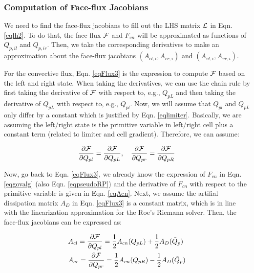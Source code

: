 \documentclass[12pt, letterpaper]{report}
\begin{document}
\subsubsection{Computation of Face-flux Jacobians}

We need to find the face-flux jacobians to fill out the LHS matrix $\mathcal{L}$ in Eqn. \ref{eqlh2}. To do
that, the face flux $\mathcal{F}$ and $F_{vn}$ will be approximated as functions of $Q_{p,il}$ and
$Q_{p,ir}$. Then, we take the corresponding derivatives to make an approximation about the face-flux
jacobians $(A_{cl,i}, A_{cr,i})$ and $(A_{vl,i}, A_{vr,i})$. \paraspace

For the convective flux, Eqn. \ref{eqFlux3} is the expression to compute $\mathcal{F}$ based on the left and
right state. When taking the derivatives, we can use the chain rule by first taking the derivative
of $\mathcal{F}$ with respect to, e.g., $Q_{pL}$ and then taking the derivative of $Q_{pL}$ with respect
to, e.g., $Q_{pl}$. Now, we will assume that $Q_{pl}$ and $Q_{pL}$ only differ by a constant which
is justified by Eqn. \ref{eqlimiter}. Basically, we are assuming the left/right state is the
primitive variable in left/right cell plus a constant term (related to limiter and cell gradient).
Therefore, we can assume:

\begin{align*}
   \frac{\partial \mathcal{F}}{\partial Q_{pl}} = \frac{\partial \mathcal{F}}{\partial Q_{pL}}, \quad \frac{\partial
   \mathcal{F}}{\partial Q_{pr}} = \frac{\partial \mathcal{F}}{\partial Q_{pR}}
\end{align*}

Now, go back to Eqn. \ref{eqFlux3}, we already know the expression of $F_{cn}$ in Eqn.
\ref{eqgovalg} (also Eqn. \ref{eqpseudoRP}) and the derivative of $F_{cn}$ with respect to the
primitive variable is given in Eqn. \ref{eqAcn}. Next, we assume the artifial dissipation matrix
$A_D$ in Eqn. \ref{eqFlux3} is a constant matrix, which is in line with the linearization
approximation for the Roe's Riemann solver. Then, the face-flux jacobians can be expressed as:

\begin{align}\label{eqAclr}
   \begin{split}
      &A_{cl} = \frac{\partial \mathcal{F}}{\partial Q_{pl}} = \frac{1}{2}A_{cn}(Q_{pL}) + \frac{1}{2}
      A_D(\tilde{Q}_p) \\ &A_{cr} = \frac{\partial \mathcal{F}}{\partial Q_{pr}} = \frac{1}{2}A_{cn}(Q_{pR}) -
      \frac{1}{2} A_D(\tilde{Q}_p)
   \end{split}
\end{align}
\end{document}
